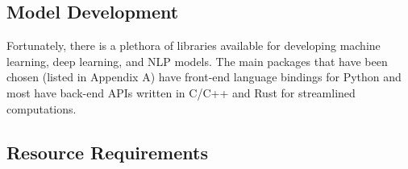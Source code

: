 \documentclass[10pt]{article}
\begin{document}
        \subsection{Model Development}
        Fortunately, there is a plethora of libraries available for developing machine learning, deep learning, and NLP models. The
        main packages that have been chosen (listed in Appendix A) have front-end language bindings for Python and most have
        back-end APIs written in C/C++ and Rust for streamlined computations.

        \subsection{Resource Requirements}

    \clearpage
\end{document}
